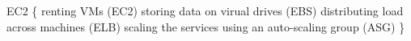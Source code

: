 EC2 \{
  \> renting VMs (EC2)
  \> storing data on virual drives (EBS)
  \> distributing load across machines (ELB)
  \> scaling the services using an auto-scaling group (ASG)
\}
